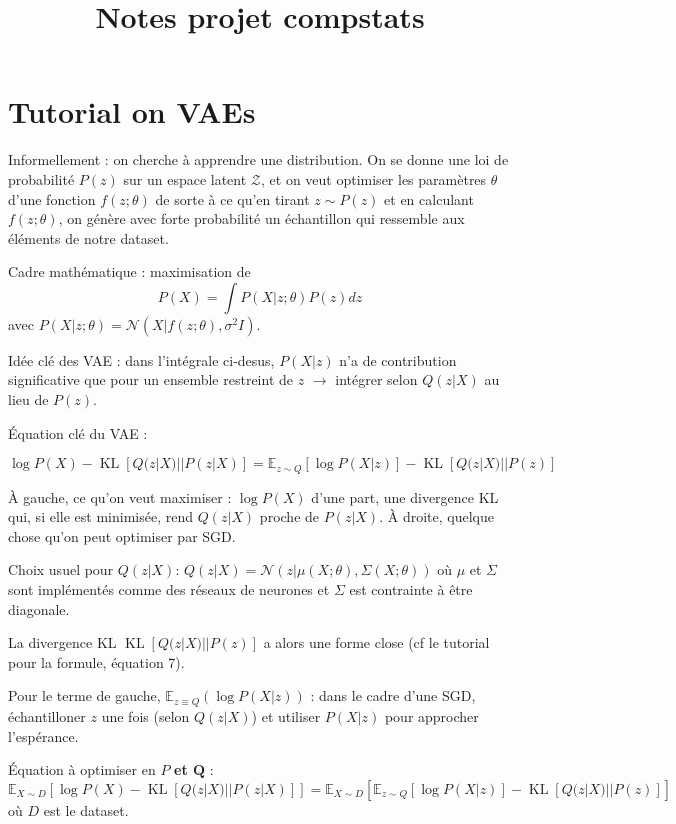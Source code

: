 \documentclass[a4paper]{article}
\title{Notes projet compstats}
\DeclareMathOperator{\KL}{\mathrm{KL}}
\begin{document}
	\section{Tutorial on VAEs}
	
	Informellement : on cherche à apprendre une distribution. On se donne une loi de probabilité $P(z)$ sur un espace latent $\mathcal{Z}$, et on veut optimiser les paramètres $\theta$ d'une fonction $f(z; \theta)$ de sorte à ce qu'en tirant $z \sim P(z)$ et en calculant $f(z; \theta)$, on génère avec forte probabilité un échantillon qui ressemble aux éléments de notre dataset.
	
	Cadre mathématique : maximisation de $$ P(X) = \int P(X|z; \theta) P(z) dz $$
	avec $P(X|z; \theta) = \mathcal{N}(X|f(z; \theta), \sigma^2 I)$.
	
	Idée clé des VAE : dans l'intégrale ci-desus, $P(X|z)$ n'a de contribution significative que pour un ensemble restreint de $z$ $\rightarrow$ intégrer selon $Q(z|X)$ au lieu de $P(z)$.
	
	Équation clé du VAE :
	
	\begin{equation}
	\log P(X) - \KL [Q(z|X)||P(z|X)] = \mathbb{E}_{z \sim Q}[\log P(X|z)] - \KL[Q(z|X)||P(z)]
	\label{eqn:VAE_core}
	\end{equation}
	
	À gauche, ce qu'on veut maximiser : $\log P(X)$ d'une part, une divergence KL qui, si elle est minimisée, rend $Q(z|X)$ proche de $P(z|X)$. À droite, quelque chose qu'on peut optimiser par SGD.
	
	\medskip
	
	Choix usuel pour $Q(z|X)$: $Q(z|X) = \mathcal{N}(z|\mu(X;\theta), \Sigma(X; \theta))$ où $\mu$ et $\Sigma$ sont implémentés comme des réseaux de neurones et $\Sigma$ est contrainte à être diagonale.
	
	La divergence KL $\KL[Q(z|X)||P(z)]$ a alors une forme close (cf le tutorial pour la formule, équation 7).
	
	Pour le terme de gauche, $\mathbb{E}_{z \equiv Q}(\log P(X|z))$ : dans le cadre d'une SGD, échantilloner $z$ une fois (selon $Q(z|X)$) et utiliser $P(X|z)$ pour approcher l'espérance.
	
	Équation à optimiser en $P$ \textbf{et $\mathbf{Q}$} :
	\begin{equation}
	\mathbb{E}_{X \sim D}[\log P(X) - \KL[Q(z|X)||P(z|X)]] = \mathbb{E}_{X \sim D}[\mathbb{E}_{z \sim Q}[\log P(X|z)] - \KL[Q(z|X)||P(z)]]
	\label{eqn:VAE_full}
	\end{equation}
	où $D$ est le dataset.
	
\end{document}

